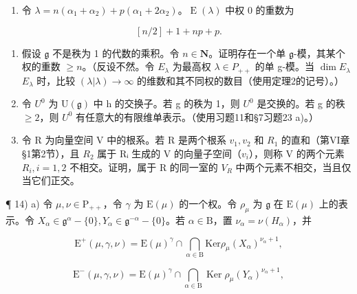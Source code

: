 \begin{enumerate}
\def\labelenumi{\alph{enumi})}
\setcounter{enumi}{1}
\tightlist
\item
  令 \(\lambda = n(\alpha_{1} + \alpha_{2}) + p(\alpha_{1} + 2\alpha_{2})\)。\(\operatorname{E}(\lambda)\) 中权 0 的重数为
\end{enumerate}

\[
[ n / 2 ] + 1 + n p + p.
\]

\begin{enumerate}
\def\labelenumi{\arabic{enumi})}
\setcounter{enumi}{10}
\item
  假设 \(\mathfrak{g}\) 不是秩为 1 的代数的乘积。令 \(n\in \mathbf{N}\)。证明存在一个单 \(\mathfrak{g}\)-模，其某个权的重数 \(\geq n\)。（反设不然。令 \(E_{\lambda}\) 为最高权 \(\lambda \in P_{++}\) 的单 g-模。当 \(\dim E_{\lambda}\)\(E_{\lambda}\) 时，比较 \((\lambda|\lambda) \to \infty\) 的维数和其不同权的数目（使用定理2的记号）。）
\item
  令 \(U^{0}\) 为 \(\mathrm{U}(\mathfrak{g})\) 中 h 的交换子。若 g 的秩为 1，则 \(U^{0}\) 是交换的。若 g 的秩 \(\geq 2\)，则 \(U^{0}\) 有任意大的有限维单表示。（使用习题11和§7习题23 a)。）
\item
  令 R 为向量空间 V 中的根系。若 R 是两个根系 \(v_{1}, v_{2}\) 和 \(R_{1}\) 的直和（第VI章§1第2节），且 \(R_{2}\) 属于 Rᵢ 生成的 V 的向量子空间（\(v_{i}\)），则称 V 的两个元素 \(R_{i}, i = 1, 2\) 不相交。证明，属于 R 的同一室的 \(V_{R}\) 中两个元素不相交，当且仅当它们正交。
\end{enumerate}

¶ 14) a) 令 \(\mu, \nu \in \mathrm{P}_{++}\)，令 \(\gamma\) 为 \(\mathrm{E}(\mu)\) 的一个权。令 \(\rho_{\mu}\) 为 \(\mathfrak{g}\) 在 \(\mathrm{E}(\mu)\) 上的表示。令 \(X_{\alpha} \in \mathfrak{g}^{\alpha} - \{0\}, Y_{\alpha} \in \mathfrak{g}^{-\alpha} - \{0\}\)。若 \(\alpha \in \mathrm{B}\)，置 \(\nu_{\alpha} = \nu(H_{\alpha})\)，并

\[
\mathrm{E} ^ {+} (\mu , \gamma , \nu) = \mathrm{E} (\mu) ^ {\gamma} \cap \bigcap_ {\alpha \in \mathrm{B}} \mathrm{Ker} \rho_ {\mu} (X _ {\alpha}) ^ {\nu_ {\alpha} + 1},
\]

\[
\mathrm{E} ^ {-} (\mu , \gamma , \nu) = \mathrm{E} (\mu) ^ {\gamma} \cap \bigcap_ {\alpha \in \mathrm{B}} \operatorname{Ker} \rho_ {\mu} (Y _ {\alpha}) ^ {\nu_ {\alpha} + 1},
\]